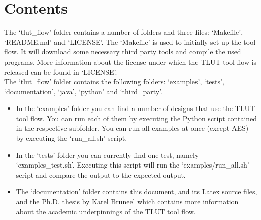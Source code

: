 \documentclass[a4paper,oneside]{memoir}
\begin{document}
\clearpage
\chapter{Contents}\label{sec:contents}
The `tlut\_flow' folder contains a number of folders and three files: `Makefile', `README.md' and `LICENSE'. 
The `Makefile' is used to initially set up the tool flow. It will download  some necessary third party tools and compile the used programs.
More information about the license under which the TLUT tool flow is released can be found in `LICENSE'.\\

The `tlut\_flow' folder contains the following folders:  `examples', `tests', `documentation',  `java', `python' and `third\_party'.

\begin{itemize}
\item In the `examples' folder you can find a number of designs that use the TLUT tool flow. You can run each of them by executing the Python script contained in the respective subfolder. You can run all examples at once (except AES) by executing the `run\_all.sh' script.
\item In the `tests' folder you can currently find one test, namely `examples\_test.sh'. Executing this script will run the `examples/run\_all.sh' script and compare the output to the expected output.
\item The `documentation' folder contains this document, and its Latex source files, and the Ph.D. thesis by Karel Bruneel which contains more information about the academic underpinnings of the TLUT tool flow.
\end{itemize}
\end{document}
